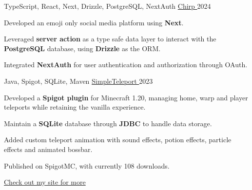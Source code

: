 

\begin{cventries}
\cventry
{TypeScript, React, Next, Drizzle, PostgreSQL, NextAuth} %
{\href{https://chirp-one-amber.vercel.app/}{Chirp {\faLink}}} %
{} %
{2024} %
{
  \begin{cvitems} %
    \item {Developed an emoji only social media platform using \textbf{Next}.}
    \item {Leveraged \textbf{server action} as a type safe data layer to interact with the \textbf{PostgreSQL} database, using \textbf{Drizzle} as the ORM.}
    \item {Integrated \textbf{NextAuth} for user authentication and authorization through OAuth.}
  \end{cvitems}
}

  \cventry
    {Java, Spigot, SQLite, Maven} %
    {\href{https://github.com/shiqui/simple-teleport}{SimpleTeleport {\faLink}}} %
    {} %
    {2023} %
    {
      \begin{cvitems} %
        \item {Developed a \textbf{Spigot plugin} for Minecraft 1.20, managing home, warp and player teleports while retaining the vanilla experience.}
        \item {Maintain a \textbf{SQLite} database through \textbf{JDBC} to handle data storage.}
        \item {Added custom teleport animation with sound effects, potion effects, particle effects and animated bossbar.}
        \item {Published on SpigotMC, with currently 108 downloads.}
      \end{cvitems}
    }
    
\href{https://shiqui.me/projects}{Check out my site for more {\faLink}}


\end{cventries}
